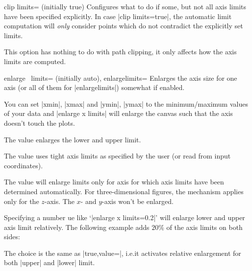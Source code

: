 \begin{pgfplotskey}{clip limits= (initially true)}
    Configures what to do if some, but not all axis limits have been specified
    explicitly. In case |clip limits=true|, the automatic limit computation
    will \emph{only} consider points which do not contradict the explicitly set
    limits.

    This option has nothing to do with path clipping, it only affects how the
    axis limits are computed.
\end{pgfplotskey}

\begin{pgfplotsxykeylist}{%
    enlarge \x\ limits= (initially auto),
    enlargelimits=%
}
    Enlarges the axis size for one axis (or all of them for |enlargelimits|)
    somewhat if enabled.

    You can set |xmin|, |xmax| and |ymin|, |ymax| to the minimum/maximum values
    of your data and |enlarge x limits| will enlarge the canvas such that the
    axis doesn't touch the plots.

    The value  enlarges the lower and upper limit.

    The value  uses tight axis limits as specified by the
    user (or read from input coordinates).

    The value  will enlarge limits only for axis for which
    axis limits have been determined automatically. For three-dimensional
    figures, the  mechanism applies only for the $z$-axis.
    The $x$- and $y$-axis won't be enlarged.
\begin{codeexample}[]
\end{codeexample}

     Specifying a number ue like `|enlarge x limits=0.2|' will
     enlarge lower and upper axis limit relatively. The following example adds
     $20\%$ of the axis limits on both sides:
\begin{codeexample}[]
\end{codeexample}
    \noindent The choice  is the same as
    |true,value=|, i.e.\@ it activates relative enlargement for
    both |upper| and |lower| limit.


\end{pgfplotsxykeylist}

